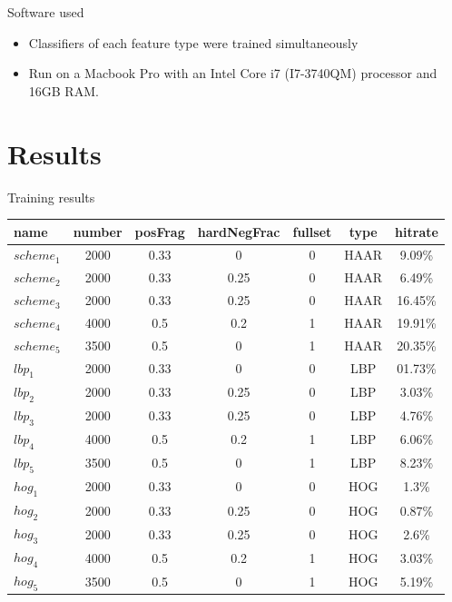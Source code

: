 \documentclass{beamer}
\begin{document}
\begin{frame}{Software used}
	\begin{itemize}
		\item Classifiers of each feature type were trained simultaneously
		\item Run on a Macbook Pro with an Intel Core i7 (I7-3740QM) processor and 16GB RAM.
	\end{itemize}
\end{frame}


\section{Results}

\begin{frame}{Training results}
	\begin{table}[H]
		\footnotesize
		\centering
		\begin{tabularx}{\textwidth}{lcccccc}
			\toprule
			\textbf{name} & \textbf{number} & \textbf{posFrag} & 
			\textbf{hardNegFrac} & \textbf{fullset} &
			 \textbf{type} & \textbf{hitrate} \\
			\midrule
			\(scheme_1\) & 2000 & 0.33 	& 0 	& 0	& HAAR	 & 9.09\% 	\\
			\(scheme_2\) & 2000 & 0.33 	& 0.25 	& 0	& HAAR	 & 6.49\% 	\\
			\(scheme_3\) & 2000 & 0.33 	& 0.25 	& 0	& HAAR	 & 16.45\% 	\\
			\(scheme_4\) & 4000 & 0.5 	& 0.2 	& 1	& HAAR	 & 19.91\% 	\\
			\(scheme_5\) & 3500 & 0.5 	& 0 	& 1	& HAAR	 & 20.35\% 	\\
			\(lbp_1\)    & 2000 & 0.33 	& 0 	& 0	& LBP	 & 01.73\% 	\\
			\(lbp_2\)    & 2000 & 0.33 	& 0.25 	& 0	& LBP	 & 3.03\% 	\\
			\(lbp_3\)    & 2000 & 0.33 	& 0.25 	& 0	& LBP	 & 4.76\% 	\\
			\(lbp_4\)    & 4000 & 0.5 	& 0.2 	& 1	& LBP	 & 6.06\% 	\\
			\(lbp_5\)    & 3500 & 0.5 	& 0 	& 1	& LBP	 & 8.23\% 	\\
			\(hog_1\)    & 2000 & 0.33 	& 0 	& 0	& HOG	 & 1.3\% 	\\
			\(hog_2\)    & 2000 & 0.33 	& 0.25 	& 0	& HOG	 & 0.87\% 	\\
			\(hog_3\)    & 2000 & 0.33 	& 0.25 	& 0	& HOG	 & 2.6\% 	\\
			\(hog_4\)    & 4000 & 0.5 	& 0.2 	& 1	& HOG	 & 3.03\% 	\\
			\(hog_5\)    & 3500 & 0.5 	& 0 	& 1	& HOG	 & 5.19\% 	\\
			\bottomrule
		\end{tabularx}%
	\end{table}
\end{frame}
\end{document}
